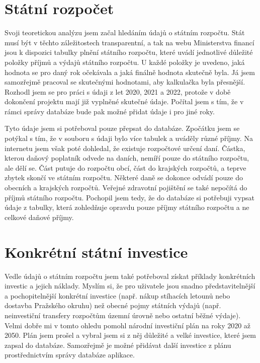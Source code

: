 \documentclass[11pt,a4paper,twoside,openright]{report}
\begin{document}
\section{Státní rozpočet}

Svoji teoretickou analýzu jsem začal hledáním údajů o státním rozpočtu. Stát musí být v
těchto záležitostech transparentní, a tak na webu Ministerstva financí jsou k dispozici
tabulky plnění státního rozpočtu, které uvádí jednotlivé důležité položky příjmů a výdajů
státního rozpočtu. U každé položky je uvedeno, jaká hodnota se pro daný rok očekávala a
jaká finálně hodnota skutečně byla. Já jsem samozřejmě pracoval se skutečnými hodnotami,
aby kalkulačka byla přesnější. Rozhodl jsem se pro práci s údaji z let 2020, 2021 a 2022, 
protože v době dokončení projektu mají již vyplněné skutečné údaje. Počítal jsem s tím, že
v rámci správy databáze bude pak možné přidat údaje i pro jiné roky.

Tyto údaje jsem si potřeboval pouze přepsat do databáze. Zpočátku jsem se potýkal s tím,
že v souboru s údaji bylo více tabulek a uváděly různé příjmy. Na internetu jsem však poté
dohledal, že existuje rozpočtové určení daní. Částka, kterou daňový poplatník odvede na daních,
nemíří pouze do státního rozpočtu, ale dělí se. Část putuje do rozpočtu obcí, část do krajských
rozpočtů, a teprve zbytek skončí ve státním rozpočtu. Některé daně se dokonce odvádí pouze
do obecních a krajských rozpočtů. Veřejné zdravotní pojištění se také nepočítá do příjmů
státního rozpočtu. Pochopil jsem tedy, že do databáze si potřebuji vypsat údaje z tabulky,
která zohledňuje opravdu pouze příjmy státního rozpočtu a ne celkové daňové příjmy.

\section{Konkrétní státní investice}

Vedle údajů o státním rozpočtu jsem také potřeboval získat příklady konkrétních investic
a jejich náklady. Myslím si, že pro uživatele jsou snadno představitelnější a pochopitelnější
konkrétní investice (např. nákup stíhacích letounů nebo dostavba Pražského okruhu) než
obecné pojmy státních výdajů (např. neinvestiční transfery rozpočtům územní úrovně nebo ostatní
běžné výdaje). Velmi dobře mi v tomto ohledu pomohl národní investiční plán na roky 2020 až 2050.
Plán jsem prošel a vybral jsem si z něj důležité a velké investice, které jsem zapsal do databáze.
Samozřejmě je možné přidávat další investice z plánu prostřednictvím správy databáze aplikace.
\end{document}

